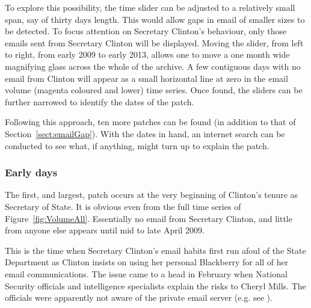 \documentclass[journal]{vgtc}                %
\begin{document}
To explore this possibility,  the time slider can be adjusted to a relatively small span, say of thirty days length.  This would allow gaps in email of smaller sizes to be detected.  To focus attention on Secretary Clinton's behaviour, only those emails sent from Secretary Clinton will be displayed.  
Moving the slider, from left to right, from early 2009 to early 2013, allows one to move a one month wide magnifying glass across the whole of the archive.  A few contiguous days with no email from Clinton will appear as a small horizontal line at zero in the email volume (magenta coloured and lower) time series.  Once found, the sliders can be further narrowed to identify the dates of the patch.

Following this approach, ten 
more patches can be found (in addition to that of Section~\ref{sect:emailGap}).  With the dates in hand, an internet search can be conducted to see what, if anything, might turn up to explain the patch.
\subsubsection{Early days}
\label{sect:youHaveNoMail}
The first, and largest, patch occurs at the very beginning of Clinton's tenure as Secretary of State.  It is  obvious even from the full time series of Figure~\ref{fig:VolumeAll}.  Essentially no email from Secretary Clinton, and little from anyone else appears until mid to late April 2009.  

This is the time when Secretary Clinton's email habits first run afoul of the State Department as Clinton insists on using her personal Blackberry for all of her email communications.  The issue came to a head in February when National Security officials and intelligence specialists explain the risks to Cheryl Mills.  The officials were apparently not aware  of the private email server (e.g. see \cite{TakingRootWashPost}).  
\end{document}
